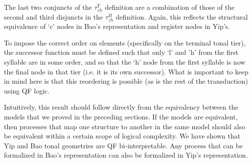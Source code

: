 \documentclass{article}
\begin{document}
The last two conjuncts of the $\tau^{Y}_{zh}$ definition are a combination of those of the second and third disjuncts in the $\tau^{B}_{zh}$ definition. Again, this reflects the structural equivalence of `c' nodes in Bao's representation and register nodes in Yip's. \par
To impose the correct order on elements (specifically on the terminal tonal tier), the successor function must be defined such that only `l' and 'h' from the first syllable are in some order, and so that the `h' node from the first syllable is now the final node in that tier (i.e. it is its own successor). What is important to keep in mind here is that this reordering is possible (as is the rest of the transduction) using QF logic. \par
Intuitively, this result should follow directly from the equivalency between the models that we proved in the preceding sections. If the models are equivalent, then processes that map one structure to another in the same model should also be equivalent within a certain scope of logical complexity. We have shown that Yip and Bao tonal geometries are QF bi-interpretable. Any process that can be formalized in Bao's representation can also be formalized in Yip's representation.
\end{document}
